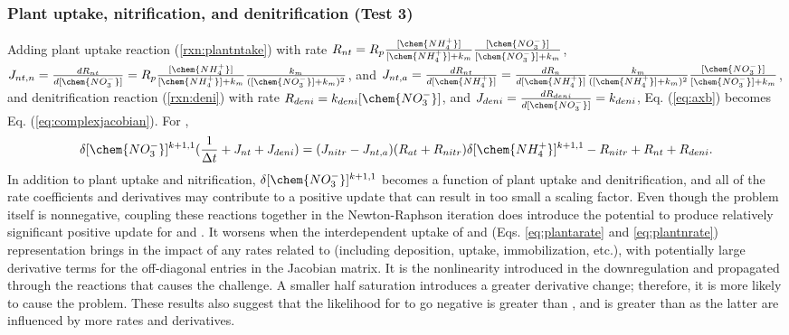 \documentclass[gmd, manuscript]{copernicus}
\begin{document}
\subsubsection{Plant uptake, nitrification, and denitrification (Test 3)}
Adding plant  uptake reaction (\ref{rxn:plantntake}) with rate
$R_{nt}=R_p\frac{[\chem{NH_4^+}]}{[\chem{NH_4^+}] +
k_m}\frac{[\chem{NO_3^-}]}{[\chem{NO_3^-}] + k_m}$, $J_{nt,n}
=\frac{dR_{nt}}{d[\chem{NO_3^-}]}=R_p\frac{[\chem{NH_4^+}]}{[\chem{NH_4^+}] +
k_m}\frac{k_m}{([\chem{NO_3^-}] + k_m)^2}$, and $J_{nt,a} =
\frac{dR_{nt}}{d[\chem{NH_4^+}]}=\frac{dR_n}{d[\chem{NH_4^+}]}
\frac{k_m}{([\chem{NH_4^+}] + k_m)^2}\frac{[\chem{NO_3^-}]}{[\chem{NO_3^-}] +
k_m}$, and denitrification reaction
(\ref{rxn:deni}) with rate $R_{deni}=k_{deni} [\chem{NO_3^-}]$, and $J_{deni} =
\frac{dR_{deni}}{d[\chem{NO_3^-}]}=k_{deni}$, Eq. (\ref{eq:axb}) becomes  
Eq. (\ref{eq:complexjacobian}).
For , 
\begin{equation}
\delta [\chem{NO_3^-}]^{k+1,1} (\frac{1}{\Delta t} + J_{nt} + J_{deni}) =
(J_{nitr} - J_{nt,a})(R_{at} + R_{nitr}) \delta [\chem{NH_4^+}]^{k+1,1} -
R_{nitr} + R_{nt} + R_{deni}.
\end{equation}
In addition to plant  uptake and nitrification, $\delta
[\chem{NO_3^-}]^{k+1,1}$ becomes a function of plant  uptake and
denitrification, and all of the rate coefficients and derivatives may
contribute to a positive update that can result in too small a scaling factor.
Even though the problem itself is nonnegative, coupling these reactions
together in the Newton-Raphson iteration does introduce the potential to
produce relatively significant positive update for  and
. It worsens when the interdependent uptake of 
and  (Eqs. \ref{eq:plantarate} and \ref{eq:plantnrate}) representation brings
in the impact of any rates related to 
(including deposition, uptake, immobilization, etc.), with potentially large
derivative terms for the off-diagonal entries in the Jacobian matrix. It is the
nonlinearity introduced in the downregulation and propagated through the
reactions that causes the challenge. A smaller half saturation introduces a
greater derivative change; therefore, it is more likely to cause the problem.
These results also suggest that the likelihood for  to go negative
is greater than , and  is greater than  as
the latter are influenced by more rates and derivatives. 
\end{document}
